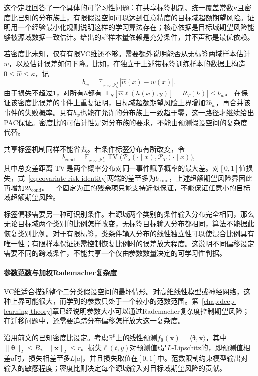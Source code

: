 这个定理回答了一个具体的可学习性问题：在共享标签机制、统一覆盖常数$\kappa$且密度比已知的分布族上，有限假设空间可以达到任意精度的目标域超额期望风险。证明用一个经验最小化规则说明这样的学习算法存在；核心依据是目标域期望风险能够被源域数据一致估计。给出的$\kappa^2$样本量依赖是充分条件，并不声称是最优依赖。

若密度比未知，仅有有限VC维还不够。需要额外说明能否从无标签两域样本估计$w$，以及估计误差如何下降。比如，在独立于上述带标签训练样本的数据上构造$0\leq\widehat w\leq\kappa$，记
\[
 b_w=\mathbb E_{x\sim\mathcal P_S^X}|\widehat w(x)-w(x)|.
\]
由于损失不超过1，对所有$h$都有
$|\mathbb E_S[\widehat w\ell(h(x),y)]-R_T(h)|\leq b_w$。
在保证该密度比误差的事件上重复证明，目标域超额期望风险上界增加$2b_w$，再合并该事件的失败概率。只有$b_w$也能在允许的分布族上一致趋于零，这一路径才继续给出PAC保证。密度比的可估计性是对分布族的要求，不能由预测假设空间的复杂度代替。

共享标签机制同样不能省去。若条件标签分布有所改变，令
\[
 b_{\mathrm{cond}}=\mathbb E_{x\sim\mathcal P_T^X}
 \operatorname{TV}\bigl(\mathcal P_S(\cdot\mid x),
                        \mathcal P_T(\cdot\mid x)\bigr),
\]
其中总变差距离$\operatorname{TV}$是两个概率分布对同一事件赋予概率的最大差。对$[0,1]$值损失，式~\eqref{eq:covariate-risk-identity}两端的差至多为$b_{\mathrm{cond}}$，上述超额期望风险界因此再增加$2b_{\mathrm{cond}}$。一个固定为正的残余项只能支持近似保证，不能保证任意小的目标域超额期望风险。

标签偏移需要另一种可识别条件。若源域两个类别的条件输入分布完全相同，那么无论目标域两个类别的比例怎样改变，无标签目标输入分布都相同，算法不能据此恢复类别比例。对于有限标签，类条件输入分布的线性独立性可以使混合比例具有唯一性；有限样本保证还需控制恢复比例时的误差放大程度。这说明不同偏移设定需要不同的跨域条件，不能共享一个仅由参数数量决定的可学习性判据。

\paragraph{参数范数与加权Rademacher复杂度}
\label{sec:transfer-norm-complexity}

VC维适合描述整个二分类假设空间的最坏情形。对高维线性模型或神经网络，这种上界可能很大，而学到的参数只处于一个较小的范数范围。第~\ref{chap:deep-learning-theory}章已经说明参数大小可以通过Rademacher复杂度控制期望风险；在迁移问题中，还需要追踪分布偏移怎样放大这一复杂度。

沿用前文的已知密度比设定。考虑$\mathbb R^p$上的线性预测$f_{\bm\theta}(\bm x)=\langle\bm\theta,\bm x\rangle$，其中$\|\bm\theta\|_2\leq B$、$\|\bm x\|_2\leq r$。损失$\ell(t,y)$对预测值$t$是$L$-Lipschitz的，即预测值相差$a$时，损失相差至多$L|a|$，并且损失取值在$[0,1]$中。范数限制约束模型输出对输入的敏感程度；密度比则决定每个源域输入对目标域期望风险的贡献。

